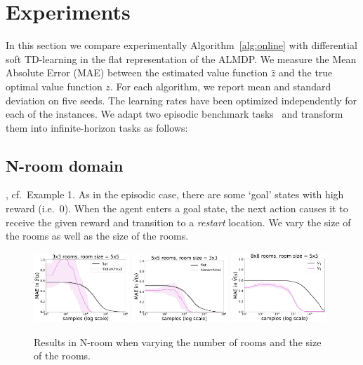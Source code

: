 \section{Experiments}

In this section we compare experimentally Algorithm~\ref{alg:online} with differential soft TD-learning in the flat representation of the ALMDP. We measure the Mean Absolute Error (MAE) between the estimated value function $\hat z$ and the true optimal value function $z$. For each algorithm, we report 
mean and standard deviation on five seeds. The learning rates have been optimized independently for each of the instances. We adapt two episodic benchmark tasks~\citep{Infante2022} and transform them into infinite-horizon tasks as follows:

  \subsection{N-room domain}, 
  cf.~Example 1. As in the episodic case, there are some `goal' states with high reward (i.e.~0). When the agent enters a goal state, the next action causes it to receive the given reward and transition to a {\it restart\/} location. We vary the size of the rooms as well as the size of the rooms.

  \begin{figure}[!ht]
  \centering
  \includegraphics*[width=0.32\textwidth]{figures/chapter2/nrooms_3_3.pdf}
  \includegraphics*[width=0.32\textwidth]{figures/chapter2/nrooms_5_5.pdf}
  \includegraphics*[width=0.32\textwidth]{figures/chapter2/nrooms_8_8.pdf}
  \caption{Results in N-room when varying the number of rooms and the size of the rooms.}
  \label{fig:nrooms}
 \end{figure}


